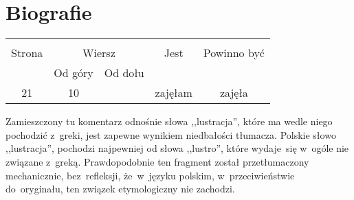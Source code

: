 \documentclass[a4paper,11pt]{article}
\begin{document}
\vspace{\spaceTwo}















\newpage
\section{Biografie}

\vspace{\spaceTwo}





\begin{center}
  \begin{tabular}{|c|c|c|c|c|}
    \hline
    & \multicolumn{2}{c|}{} & & \\
    Strona & \multicolumn{2}{c|}{Wiersz} & Jest
                              & Powinno być \\ \cline{2-3}
    & Od góry & Od dołu & & \\
    \hline
    21 & 10 & & zajęłam & zajęła \\
    \hline
  \end{tabular}
\end{center}

\vspace{\spaceTwo}








\start {} Zamieszczony tu komentarz odnośnie słowa
,,lustracja'', które ma wedle niego pochodzić z~greki, jest zapewne
wynikiem niedbałości tłumacza. Polskie słowo ,,lustracja'', pochodzi
najpewniej od słowa ,,lustro'', które wydaje~się w~ogóle nie związane
z~greką. Prawdopodobnie ten fragment został przetłumaczony
mechanicznie, bez~refleksji, że~w~języku polskim, w~przeciwieństwie
do~oryginału, ten związek etymologiczny nie zachodzi.
\end{document}
